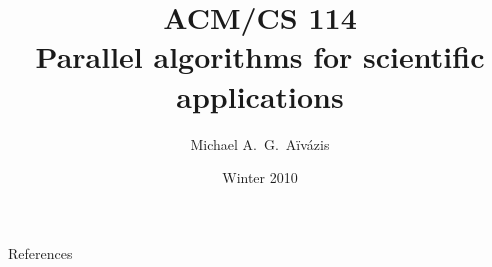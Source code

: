 \documentclass{beamer}
\title[ACM/CS 114 -- Winter 2010]{ACM/CS 114 \\ Parallel algorithms for scientific applications}
\author{Michael A.~G.~A\"iv\'azis}
\institute{California Institute of Technology}
\date{Winter 2010}
\begin{document}
\begin{frame}
  \titlepage
\end{frame}





\begin{frame}{References}


\end{frame}
\end{document}
